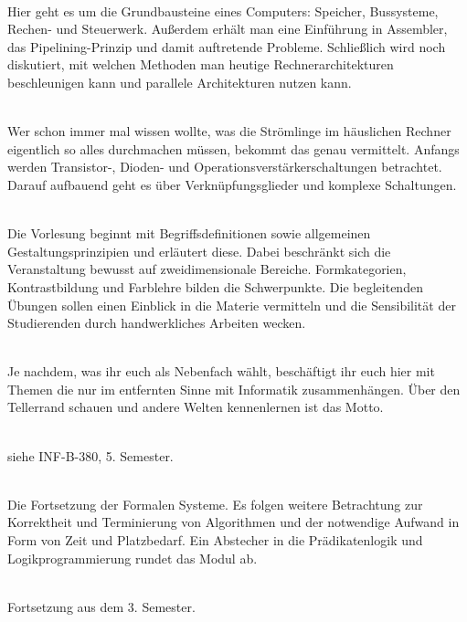 \textbf{} \\
Hier geht es um die Grundbausteine eines Computers:
Speicher, Bussysteme, Rechen- und Steuerwerk.
Außerdem erhält man eine Einführung in Assembler, das Pipelining-Prinzip und damit auftretende Probleme.
Schließlich wird noch diskutiert, mit welchen Methoden man heutige Rechnerarchitekturen beschleunigen kann und parallele Architekturen nutzen kann.

\textbf{} \\
Wer schon immer mal wissen wollte, was die Strömlinge im häuslichen Rechner eigentlich so alles durchmachen müssen, bekommt das genau vermittelt.
Anfangs werden Transistor-, Dioden- und Operationsverstärkerschaltungen betrachtet.
Darauf aufbauend geht es über Verknüpfungsglieder und komplexe Schaltungen.

\textbf{} \\
Die Vorlesung beginnt mit Begriffsdefinitionen sowie allgemeinen Gestaltungsprinzipien und erläutert diese.
Dabei beschränkt sich die Veranstaltung bewusst auf zweidimensionale Bereiche.
Formkategorien, Kontrastbildung und Farblehre bilden die Schwerpunkte.
Die begleitenden Übungen sollen einen Einblick in die Materie vermitteln und die Sensibilität der Studierenden durch handwerkliches Arbeiten wecken.

\textbf{} \\
Je nachdem, was ihr euch als Nebenfach wählt, beschäftigt ihr euch hier mit Themen die nur im entfernten Sinne mit Informatik zusammenhängen.
Über den Tellerrand schauen und andere Welten kennenlernen ist das Motto.

\textbf{} \\
siehe INF-B-380, 5. Semester.


\textbf{} \\
Die Fortsetzung der Formalen Systeme.
Es folgen weitere Betrachtung zur Korrektheit und Terminierung von Algorithmen und der notwendige Aufwand in Form von Zeit und Platzbedarf.
Ein Abstecher in die Prädikatenlogik und Logikprogrammierung rundet das Modul ab.

\textbf{} \\
Fortsetzung aus dem 3. Semester.

